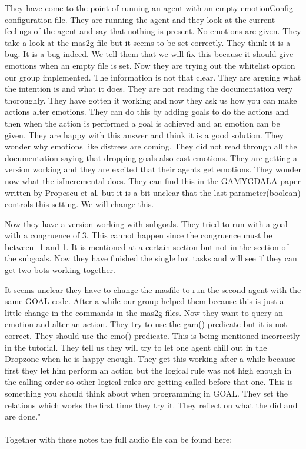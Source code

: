 \documentclass[11pt]{article}
\begin{document}
\begin{appendices}
	They have come to the point of running an agent with an empty emotionConfig configuration file. They are running the agent and they look at the current feelings of the agent and say that nothing is present. No emotions are given. They take a look at the mas2g file but it seems to be set correctly. They think it is a bug. It is a bug indeed. We tell them that we will fix this because it should give emotions when an empty file is set. Now they are trying out the whitelist option our group implemented. The information is not that clear. They are arguing what the intention is and what it does. They are not reading the documentation very thoroughly. They have gotten it working and now they ask us how you can make actions alter emotions. They can do this by adding goals to do the actions and then when the action is performed a goal is achieved and an emotion can be given. They are happy with this answer and think it is a good solution. They wonder why emotions like distress are coming. They did not read through all the documentation saying that dropping goals also cast emotions. They are getting a version working and they are excited that their agents get emotions. They wonder now what the isIncremental does. They can find this in the GAMYGDALA paper written by Propescu et al.\cite{GAMYGDALA paper} but it is a bit unclear that the last parameter(boolean) controls this setting. We will change this. \par Now they have a version working with subgoals. They tried to run with a goal with a congruence of 3. This cannot happen since the congruence must be between -1 and 1. It is mentioned at a certain section but not in the section of the subgoals. Now they have finished the single bot tasks and will see if they can get two bots working together.\par It seems unclear they have to change the masfile to run the second agent with the same GOAL code. After a while our group helped them because this is just a little change in the commands in the mas2g files. Now they want to query an emotion and alter an action. They try to use the gam() predicate but it is not correct. They should use the emo() predicate. This is being mentioned incorrectly in the tutorial. They tell us they will try to let one agent chill out in the Dropzone when he is happy enough. They get this working after a while because first they let him perform an action but the logical rule was not high enough in the calling order so other logical rules are getting called before that one. This is something you should think about when programming in GOAL. They set the relations which works the first time they try it. They reflect on what the did and are done."\\
	\\
	Together with these notes the full audio file can be found here:
	\cite{recording}
\end{appendices}
\end{document}

